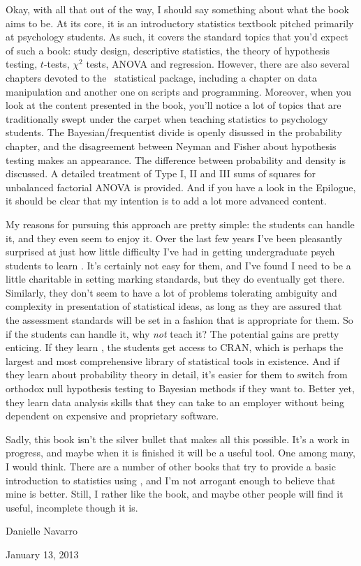 Okay, with all that out of the way, I should say something about what the book aims to be. At its core, it is an introductory statistics textbook pitched primarily at psychology students. As such, it covers the standard topics that you'd expect of such a book: study design, descriptive statistics, the theory of hypothesis testing, $t$-tests, $\chi^2$ tests, ANOVA and regression. However, there are also several chapters devoted to the \R\ statistical package, including a chapter on data manipulation and another one on scripts and programming. Moreover, when you look at the content presented in the book, you'll notice a lot of topics that are traditionally swept under the carpet when teaching statistics to psychology students. The Bayesian/frequentist divide is openly disussed in the probability chapter, and the disagreement between Neyman and Fisher about hypothesis testing makes an appearance. The difference between probability and density is discussed. A detailed treatment of Type I, II and III sums of squares for unbalanced factorial ANOVA is provided. And if you have a look in the Epilogue, it should be clear that my intention is to add a lot more advanced content.\vsp

My reasons for pursuing this approach are pretty simple: the students can handle it, and they even seem to enjoy it. Over the last few years I've been pleasantly surprised at just how little difficulty I've had in getting undergraduate psych students to learn \R. It's certainly not easy for them, and I've found I need to be a little charitable in setting marking standards, but they do eventually get there. Similarly, they don't seem to have a lot of problems tolerating ambiguity and complexity in presentation of statistical ideas, 
as long as they are assured that the assessment standards will be set in a fashion that is appropriate for them.  So if the students can handle it, why {\it not} teach it? The potential gains are pretty enticing. If they learn \R, the students get access to CRAN, which is perhaps the largest and most comprehensive library of statistical tools in existence. And if they learn about probability theory in detail, it's easier for them to switch from orthodox null hypothesis testing to Bayesian methods if they want to. Better yet, they learn data analysis skills that they can take to an employer without being dependent on expensive and proprietary software. \vsp

Sadly, this book isn't the silver bullet that makes all this possible. It's a work in progress, and maybe when it is finished it will be a useful tool. One among many, I would think. There are a number of other books that try to provide a basic introduction to statistics using \R, and I'm not arrogant enough to believe that mine is better. Still, I rather like the book, and maybe other people will find it useful, incomplete though it is.

\vspace*{24pt}
\noindent
Danielle Navarro 

\noindent
January 13, 2013
\clearpage 











